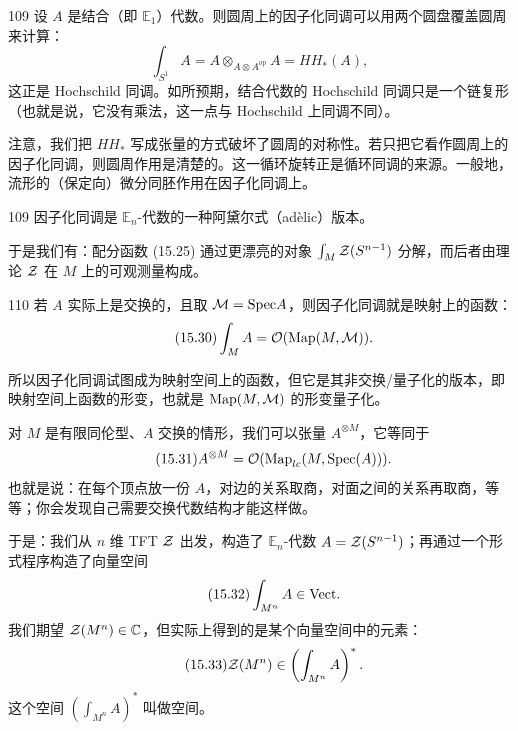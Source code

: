 \begin{srcex}{109}
设 $A$ 是结合（即 $\mathbb{E}_1$）代数。则圆周上的因子化同调可以用两个圆盘覆盖圆周来计算：
\begin{equation}\tag{15.29}
\int_{S^1}A=A\otimes_{A\otimes A^{\mathrm{op}}}A=HH_*(A),
\end{equation}
这正是 Hochschild 同调。如所预期，结合代数的 Hochschild 同调只是一个链复形（也就是说，它没有乘法，这一点与 Hochschild 上同调不同）。
\end{srcex}

注意，我们把 $HH_*$ 写成张量的方式破坏了圆周的对称性。若只把它看作圆周上的因子化同调，则圆周作用是清楚的。这一循环旋转正是循环同调的来源。一般地，流形的（保定向）微分同胚作用在因子化同调上。

\begin{srcrem}{109}
因子化同调是 $\mathbb{E}_n$-代数的一种阿黛尔式（adèlic）版本。
\end{srcrem}

于是我们有：配分函数 (15.25) 通过更漂亮的对象 $\int_M\mathcal{Z}(S^{n-1})$ 分解，而后者由理论 $\mathcal{Z}$ 在 $M$ 上的可观测量构成。

\begin{srcex}{110}
若 $A$ 实际上是交换的，且取 $\mathcal{M}=\mathrm{Spec} A$，则因子化同调就是映射上的函数：
\begin{equation}\tag{15.30}
\int_M A=\mathcal{O}(\mathrm{Map}(M,\mathcal{M})).
\end{equation}
\end{srcex}

所以因子化同调试图成为映射空间上的函数，但它是其非交换/量子化的版本，即映射空间上函数的形变，也就是 $\mathrm{Map}(M,\mathcal{M})$ 的形变量子化。

对 $M$ 是有限同伦型、$A$ 交换的情形，我们可以张量 $A^{\otimes M}$，它等同于
\begin{equation}\tag{15.31}
A^{\otimes M}=\mathcal{O}(\mathrm{Map}_{lc}(M,\mathrm{Spec}(A))).
\end{equation}
也就是说：在每个顶点放一份 $A$，对边的关系取商，对面之间的关系再取商，等等；你会发现自己需要交换代数结构才能这样做。

于是：我们从 $n$ 维 TFT $\mathcal{Z}$ 出发，构造了 $\mathbb{E}_n$-代数 $A=\mathcal{Z}(S^{n-1})$；再通过一个形式程序构造了向量空间
\begin{equation}\tag{15.32}
\int_{M^n}A\in\mathrm{Vect}.
\end{equation}
我们期望 $\mathcal{Z}(M^n)\in\mathbb{C}$，但实际上得到的是某个向量空间中的元素：
\begin{equation}\tag{15.33}
\mathcal{Z}(M^n)\in\left(\int_{M^n}A\right)^*.
\end{equation}
这个空间 $\left(\int_{M^n}A\right)^*$ 叫做空间。

